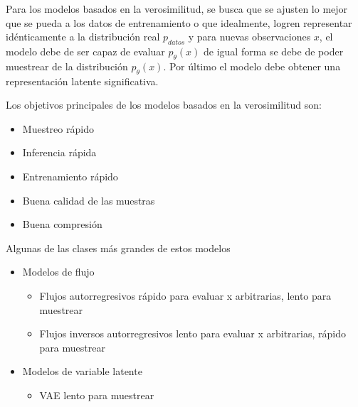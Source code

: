 
Para los modelos basados en la verosimilitud, se busca que se ajusten lo mejor que se pueda a los datos de entrenamiento o que idealmente, logren representar idénticamente a la distribución real $p_{datos}$ y para nuevas observaciones $x$, el modelo debe de ser capaz de evaluar $p_{\theta}(x)$ de igual forma se debe de poder muestrear de la distribución $p_{\theta}(x)$. Por último el modelo debe obtener una representación latente significativa.

Los objetivos principales de los modelos basados en la verosimilitud son:
\begin{itemize}
	\item Muestreo rápido
	\item Inferencia rápida
	\item Entrenamiento rápido
	\item Buena calidad de las muestras
	\item Buena compresión
\end{itemize}

Algunas de las clases más grandes de estos modelos
\begin{itemize}
	\item Modelos de flujo
	\begin{itemize}
		\item Flujos autorregresivos rápido para evaluar x arbitrarias, lento para muestrear
		\item Flujos inversos autorregresivos lento para evaluar x arbitrarias, rápido para muestrear
	\end{itemize}
	\item Modelos de variable latente
	\begin{itemize}
		\item VAE lento para muestrear
	\end{itemize}
\end{itemize}


